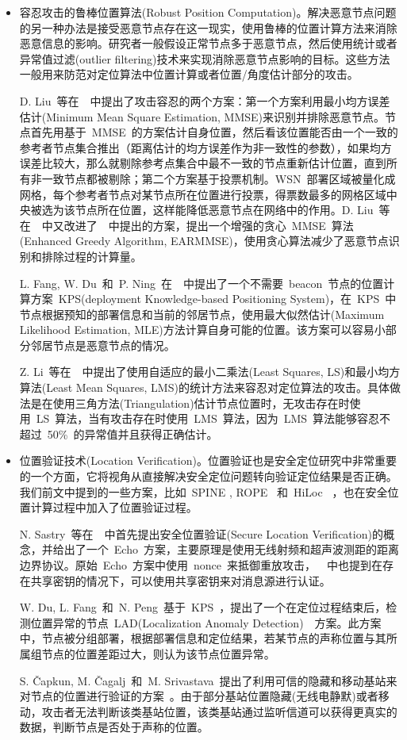 \documentclass[a4paper,10pt]{article}
\begin{document}
\begin{itemize}
\item 容忍攻击的鲁棒位置算法(Robust Position Computation)。解决恶意节点问题的另一种办法是接受恶意节点存在这一现实，使用鲁棒的位置计算方法来消除恶意信息的影响。研究者一般假设正常节点多于恶意节点，然后使用统计或者异常值过滤(outlier filtering)技术来实现消除恶意节点影响的目标。这些方法一般用来防范对定位算法中位置计算或者位置/角度估计部分的攻击。

D. Liu~等在~\cite{Liu2005b}~中提出了攻击容忍的两个方案：第一个方案利用最小均方误差估计(Minimum Mean Square Estimation, MMSE)来识别并排除恶意节点。节点首先用基于~MMSE~的方案估计自身位置，然后看该位置能否由一个一致的参考者节点集合推出（距离估计的均方误差作为非一致性的参数），如果均方误差比较大，那么就剔除参考点集合中最不一致的节点重新估计位置，直到所有非一致节点都被剔除；第二个方案基于投票机制。WSN~部署区域被量化成网格，每个参考者节点对某节点所在位置进行投票，得票数最多的网格区域中央被选为该节点所在位置，这样能降低恶意节点在网络中的作用。D. Liu~等在~\cite{Liu2008a}~中又改进了~\cite{Liu2005b}~中提出的方案，提出一个增强的贪心~MMSE~算法(Enhanced Greedy Algorithm, EARMMSE)，使用贪心算法减少了恶意节点识别和排除过程的计算量。

L. Fang, W. Du~和~P. Ning~在~\cite{Fang2005}~中提出了一个不需要~beacon~节点的位置计算方案~KPS(deployment Knowledge-based Positioning System)，在~KPS~中节点根据预知的部署信息和当前的邻居节点，使用最大似然估计(Maximum Likelihood Estimation, MLE)方法计算自身可能的位置。该方案可以容易小部分邻居节点是恶意节点的情况。

Z. Li~等在~\cite{Li2005a}~中提出了使用自适应的最小二乘法(Least Squares, LS)和最小均方算法(Least Mean Squares, LMS)的统计方法来容忍对定位算法的攻击。具体做法是在使用三角方法(Triangulation)估计节点位置时，无攻击存在时使用~LS~算法，当有攻击存在时使用~LMS~算法，因为~LMS~算法能够容忍不超过~50\%~的异常值并且获得正确估计。

\item 位置验证技术(Location Verification)。位置验证也是安全定位研究中非常重要的一个方面，它将视角从直接解决安全定位问题转向验证定位结果是否正确。我们前文中提到的一些方案，比如~SPINE \cite{Lazos2005a}, ROPE \cite{Lazos2006}~和~HiLoc \cite{Lazos2005a}~，也在安全位置计算过程中加入了位置验证过程。

N. Sastry~等在~\cite{Sastry2003}~中首先提出安全位置验证(Secure Location Verification)的概念，并给出了一个~Echo~方案，主要原理是使用无线射频和超声波测距的距离边界协议。原始~Echo~方案中使用~nonce~来抵御重放攻击，~\cite{Sastry2003}~中也提到在存在共享密钥的情况下，可以使用共享密钥来对消息源进行认证。

W. Du, L. Fang~和~N. Peng~基于~KPS~\cite{Fang2005}，提出了一个在定位过程结束后，检测位置异常的节点~LAD(Localization Anomaly Detection)~\cite{Du2006}~方案。此方案中，节点被分组部署，根据部署信息和定位结果，若某节点的声称位置与其所属组节点的位置差距过大，则认为该节点位置异常。

S. \v{C}apkun, M. \v{C}agalj~和~M. Srivastava~提出了利用可信的隐藏和移动基站来对节点的位置进行验证的方案~\cite{Capkun2006a, Capkun2008}。由于部分基站位置隐藏(无线电静默)或者移动，攻击者无法判断该类基站位置，该类基站通过监听信道可以获得更真实的数据，判断节点是否处于声称的位置。

\end{itemize}
\end{document}

